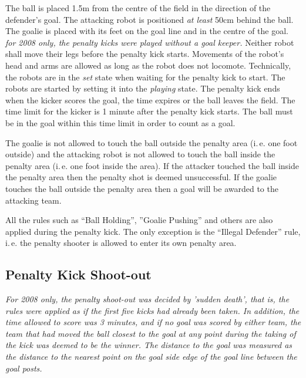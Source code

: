 \documentclass[12pt]{article}
\newcommand{\ie}{\mbox{i.\,e.}\xspace}
\begin{document}
The ball is placed 1.5m from the centre of the field in the direction
of the defender's goal. The attacking robot is positioned 
\emph{at least} 50cm
behind the ball. The goalie is placed with its feet on the
goal line and in the centre of the goal. 
\emph{for 2008 only, the penalty kicks were played without a goal keeper.}
Neither robot shall
move their legs before the penalty kick starts. Movements of the
robot's head and arms are allowed as long as the robot does not
locomote. Technically, the robots are in the \emph{set} state when
waiting for the penalty kick to start. The robots are started by
setting it into the \emph{playing} state.%
The penalty
kick ends when the kicker scores the goal, the time expires or the
ball leaves the field. The time limit for the kicker is 1 minute
after the penalty kick starts. The ball must be in the goal within
this time limit in order to count as a goal.

The goalie is not allowed to touch the ball outside the penalty area (\ie one foot
outside) and the attacking robot is not allowed to touch the ball inside the penalty
area (\ie one foot inside the area). If the attacker touched the ball inside the
penalty area then the penalty shot is deemed unsuccessful. If the
goalie touches the ball outside the penalty area then a goal will be awarded to the
attacking team.

All the rules such as ``Ball Holding'', ''Goalie Pushing'' and
others are also applied during the penalty kick. The only exception
is the ``Illegal Defender'' rule, \ie the penalty shooter is allowed
to enter its own penalty area.

\subsection{Penalty Kick Shoot-out}
\label{sec:penalty_shoot-out}

%
\emph{For 2008 only, the penalty shoot-out was decided by 'sudden death', that is, the rules were
applied as if the first five kicks had already been taken. In addition, the time allowed to score was 3 minutes, and if no goal was
scored by either team, the team that had moved the ball closest to the goal at any point during the taking of the kick was deemed to be the winner. The distance to the goal was measured as the distance to the nearest point on the goal side edge of the goal line between the goal posts.}
\end{document}
